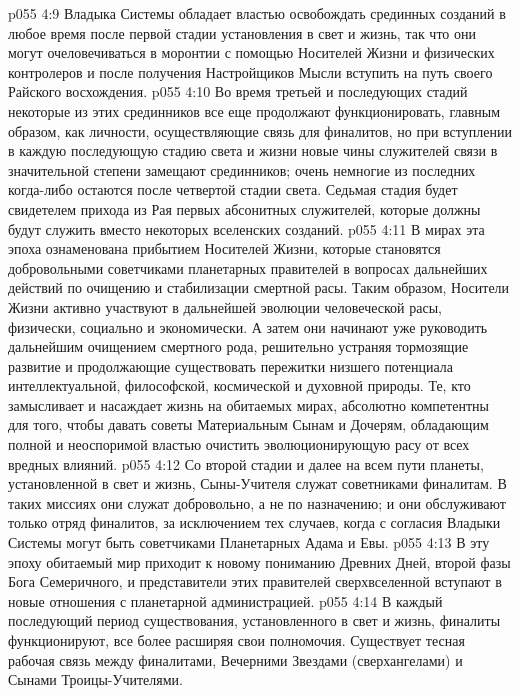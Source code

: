 \vs p055 4:9 Владыка Системы обладает властью освобождать срединных созданий в любое время после первой стадии установления в свет и жизнь, так что они могут очеловечиваться в моронтии с помощью Носителей Жизни и физических контролеров и после получения Настройщиков Мысли вступить на путь своего Райского восхождения.
\vs p055 4:10 Во время третьей и последующих стадий некоторые из этих срединников все еще продолжают функционировать, главным образом, как личности, осуществляющие связь для финалитов, но при вступлении в каждую последующую стадию света и жизни новые чины служителей связи в значительной степени замещают срединников; очень немногие из последних когда\hyp{}либо остаются после четвертой стадии света. Седьмая стадия будет свидетелем прихода из Рая первых абсонитных служителей, которые должны будут служить вместо некоторых вселенских созданий.
\vs p055 4:11 \pc {}\bibnobreakspace {} В мирах эта эпоха ознаменована прибытием Носителей Жизни, которые становятся добровольными советчиками планетарных правителей в вопросах дальнейших действий по очищению и стабилизации смертной расы. Таким образом, Носители Жизни активно участвуют в дальнейшей эволюции человеческой расы, физически, социально и экономически. А затем они начинают уже руководить дальнейшим очищением смертного рода, решительно устраняя тормозящие развитие и продолжающие существовать пережитки низшего потенциала интеллектуальной, философской, космической и духовной природы. Те, кто замысливает и насаждает жизнь на обитаемых мирах, абсолютно компетентны для того, чтобы давать советы Материальным Сынам и Дочерям, обладающим полной и неоспоримой властью очистить эволюционирующую расу от всех вредных влияний.
\vs p055 4:12 Со второй стадии и далее на всем пути планеты, установленной в свет и жизнь, Сыны\hyp{}Учителя служат советниками финалитам. В таких миссиях они служат добровольно, а не по назначению; и они обслуживают только отряд финалитов, за исключением тех случаев, когда с согласия Владыки Системы могут быть советчиками Планетарных Адама и Евы.
\vs p055 4:13 \pc {}\bibnobreakspace {} В эту эпоху обитаемый мир приходит к новому пониманию Древних Дней, второй фазы Бога Семеричного, и представители этих правителей сверхвселенной вступают в новые отношения с планетарной администрацией.
\vs p055 4:14 В каждый последующий период существования, установленного в свет и жизнь, финалиты функционируют, все более расширяя свои полномочия. Существует тесная рабочая связь между финалитами, Вечерними Звездами (сверхангелами) и Сынами Троицы\hyp{}Учителями.
